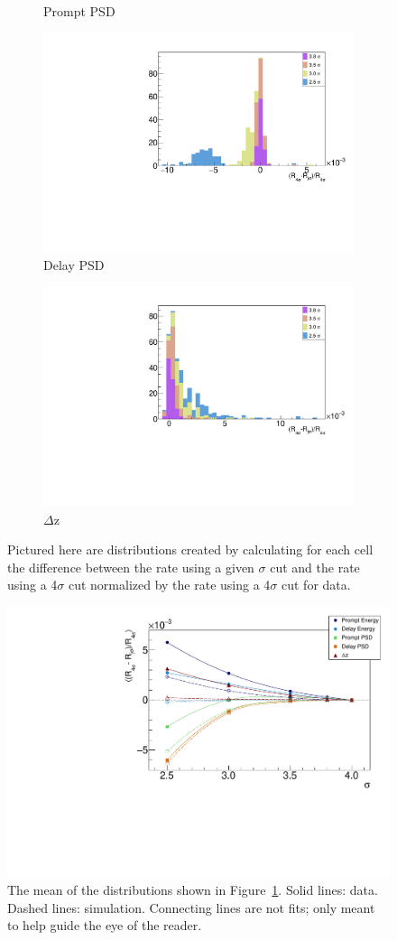 \begin{figure}[H]
\begin{subfigure}{0.5\linewidth}
		\caption{Prompt PSD}
	\end{subfigure}
	\begin{subfigure}{0.5\linewidth}
		\centering
		\includegraphics[width=0.85\linewidth]{tex/6-ac227-images/Systematics_Cuts/ResidVsCell_DelayPSDCut}
		\caption{Delay PSD}
	\end{subfigure}
	\begin{subfigure}{1\linewidth}
		\centering
		\includegraphics[width=0.425\linewidth]{tex/6-ac227-images/Systematics_Cuts/ResidVsCell_DzCut}
		\caption{$\Delta$z}
	\end{subfigure}
	\caption{Pictured here are distributions created by calculating for each cell the difference between the rate using a given $\sigma$ cut and the rate using a 4$\sigma$ cut normalized by the rate using a 4$\sigma$ cut for data.}
	\label{fig:CutSys}
\end{figure}

\begin{figure}[H]
	\centering
	\includegraphics[width=0.8\linewidth]{tex/6-ac227-images/Systematics_Cuts/CutStudyResults}
	\caption{The mean of the distributions shown in Figure~\ref{fig:CutSys}. Solid lines: data. Dashed lines: simulation. Connecting lines are not fits; only meant to help guide the eye of the reader.}
	\label{fig:cutstudyresults}
\end{figure}

